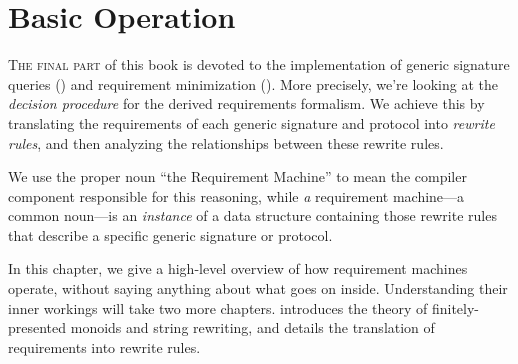\documentclass[../generics]{subfiles}
\begin{document}
\chapter{Basic Operation}\label{rqm basic operation}

\lettrine{T}{he final part} of this book is devoted to the implementation of generic signature queries () and requirement minimization (). More precisely, we're looking at the \emph{decision procedure} for the derived requirements formalism. We achieve this by translating the requirements of each generic signature and protocol into \emph{rewrite rules}, and then analyzing the relationships between these rewrite rules.

We use the proper noun ``the Requirement Machine'' to mean the compiler component responsible for this reasoning, while \emph{a} requirement machine---a common noun---is an \emph{instance} of a data structure containing those rewrite rules that describe a specific generic signature or protocol.

In this chapter, we give a high-level overview of how requirement machines operate, without saying anything about what goes on inside. Understanding their inner workings will take two more chapters.  introduces the theory of finitely-presented monoids and string rewriting, and  details the translation of requirements into rewrite rules.

\smallskip
\end{document}
